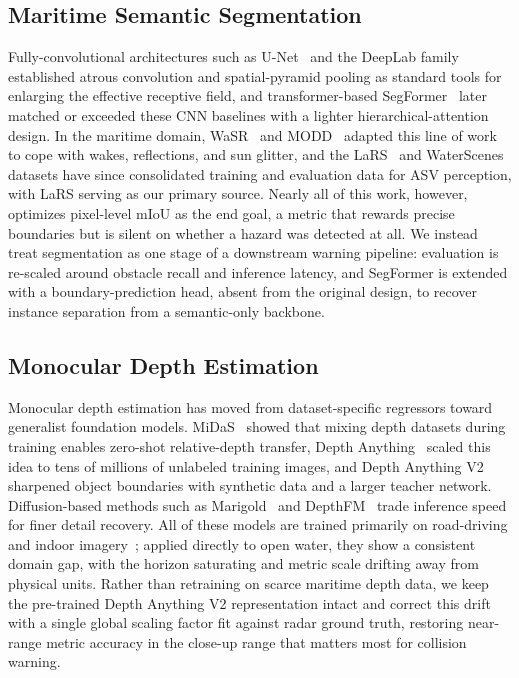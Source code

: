 
\subsection{Maritime Semantic Segmentation}

Fully-convolutional architectures such as U-Net~\cite{ronneberger2015unetconvolutionalnetworksbiomedical} and the DeepLab family~\cite{chen2017rethinkingatrousconvolutionsemantic} established atrous convolution and spatial-pyramid pooling as standard tools for enlarging the effective receptive field, and transformer-based SegFormer~\cite{xie2021segformersimpleefficientdesign} later matched or exceeded these CNN baselines with a lighter hierarchical-attention design. In the maritime domain, WaSR~\cite{bovcon2021wasr} and MODD~\cite{Kristan2015} adapted this line of work to cope with wakes, reflections, and sun glitter, and the LaRS~\cite{zust2023larsdiversepanopticmaritime} and WaterScenes~\cite{yao2024waterscenesmultitask4dradarcamera} datasets have since consolidated training and evaluation data for ASV perception, with LaRS serving as our primary source. Nearly all of this work, however, optimizes pixel-level mIoU as the end goal, a metric that rewards precise boundaries but is silent on whether a hazard was detected at all. We instead treat segmentation as one stage of a downstream warning pipeline: evaluation is re-scaled around obstacle recall and inference latency, and SegFormer is extended with a boundary-prediction head, absent from the original design, to recover instance separation from a semantic-only backbone.

\subsection{Monocular Depth Estimation}

Monocular depth estimation has moved from dataset-specific regressors toward generalist foundation models. MiDaS~\cite{ranftl2020robustmonoculardepthestimation} showed that mixing depth datasets during training enables zero-shot relative-depth transfer, Depth Anything~\cite{yang2024depthanything} scaled this idea to tens of millions of unlabeled training images, and Depth Anything V2~\cite{yang2024depthv2} sharpened object boundaries with synthetic data and a larger teacher network. Diffusion-based methods such as Marigold~\cite{ke2025marigoldaffordableadaptationdiffusionbased} and DepthFM~\cite{gui2024depthfmfastmonoculardepth} trade inference speed for finer detail recovery. All of these models are trained primarily on road-driving and indoor imagery~\cite{gaidon2016virtualworldsproxymultiobject}; applied directly to open water, they show a consistent domain gap, with the horizon saturating and metric scale drifting away from physical units. Rather than retraining on scarce maritime depth data, we keep the pre-trained Depth Anything V2 representation intact and correct this drift with a single global scaling factor fit against radar ground truth, restoring near-range metric accuracy in the close-up range that matters most for collision warning.

